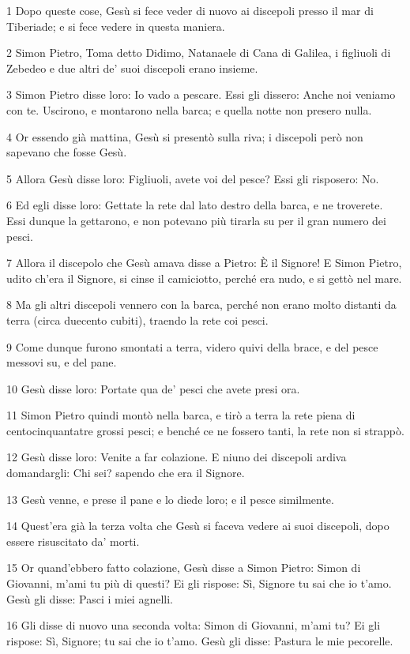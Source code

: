 \par 1 Dopo queste cose, Gesù si fece veder di nuovo ai discepoli presso il mar di Tiberiade; e si fece vedere in questa maniera.
\par 2 Simon Pietro, Toma detto Didimo, Natanaele di Cana di Galilea, i figliuoli di Zebedeo e due altri de' suoi discepoli erano insieme.
\par 3 Simon Pietro disse loro: Io vado a pescare. Essi gli dissero: Anche noi veniamo con te. Uscirono, e montarono nella barca; e quella notte non presero nulla.
\par 4 Or essendo già mattina, Gesù si presentò sulla riva; i discepoli però non sapevano che fosse Gesù.
\par 5 Allora Gesù disse loro: Figliuoli, avete voi del pesce? Essi gli risposero: No.
\par 6 Ed egli disse loro: Gettate la rete dal lato destro della barca, e ne troverete. Essi dunque la gettarono, e non potevano più tirarla su per il gran numero dei pesci.
\par 7 Allora il discepolo che Gesù amava disse a Pietro: È il Signore! E Simon Pietro, udito ch'era il Signore, si cinse il camiciotto, perché era nudo, e si gettò nel mare.
\par 8 Ma gli altri discepoli vennero con la barca, perché non erano molto distanti da terra (circa duecento cubiti), traendo la rete coi pesci.
\par 9 Come dunque furono smontati a terra, videro quivi della brace, e del pesce messovi su, e del pane.
\par 10 Gesù disse loro: Portate qua de' pesci che avete presi ora.
\par 11 Simon Pietro quindi montò nella barca, e tirò a terra la rete piena di centocinquantatre grossi pesci; e benché ce ne fossero tanti, la rete non si strappò.
\par 12 Gesù disse loro: Venite a far colazione. E niuno dei discepoli ardiva domandargli: Chi sei? sapendo che era il Signore.
\par 13 Gesù venne, e prese il pane e lo diede loro; e il pesce similmente.
\par 14 Quest'era già la terza volta che Gesù si faceva vedere ai suoi discepoli, dopo essere risuscitato da' morti.
\par 15 Or quand'ebbero fatto colazione, Gesù disse a Simon Pietro: Simon di Giovanni, m'ami tu più di questi? Ei gli rispose: Sì, Signore tu sai che io t'amo. Gesù gli disse: Pasci i miei agnelli.
\par 16 Gli disse di nuovo una seconda volta: Simon di Giovanni, m'ami tu? Ei gli rispose: Sì, Signore; tu sai che io t'amo. Gesù gli disse: Pastura le mie pecorelle.
